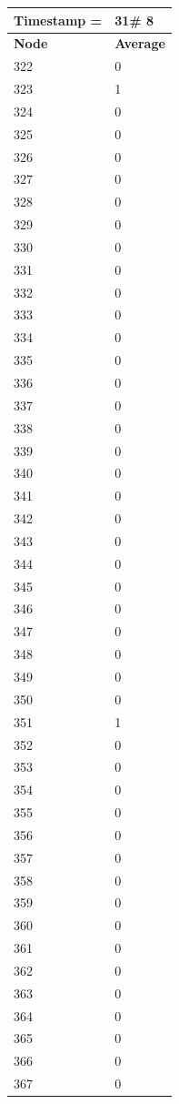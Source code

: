 \begin{tabular}{|l||l|}
\hline
\textbf{Timestamp =} & \textbf{31}\# 8\\\hline
	\textbf{Node} & \textbf{Average} \\ \hline
\hline
	322 & 0 \\ \hline
	323 & 1 \\ \hline
	324 & 0 \\ \hline
	325 & 0 \\ \hline
	326 & 0 \\ \hline
	327 & 0 \\ \hline
	328 & 0 \\ \hline
	329 & 0 \\ \hline
	330 & 0 \\ \hline
	331 & 0 \\ \hline
	332 & 0 \\ \hline
	333 & 0 \\ \hline
	334 & 0 \\ \hline
	335 & 0 \\ \hline
	336 & 0 \\ \hline
	337 & 0 \\ \hline
	338 & 0 \\ \hline
	339 & 0 \\ \hline
	340 & 0 \\ \hline
	341 & 0 \\ \hline
	342 & 0 \\ \hline
	343 & 0 \\ \hline
	344 & 0 \\ \hline
	345 & 0 \\ \hline
	346 & 0 \\ \hline
	347 & 0 \\ \hline
	348 & 0 \\ \hline
	349 & 0 \\ \hline
	350 & 0 \\ \hline
	351 & 1 \\ \hline
	352 & 0 \\ \hline
	353 & 0 \\ \hline
	354 & 0 \\ \hline
	355 & 0 \\ \hline
	356 & 0 \\ \hline
	357 & 0 \\ \hline
	358 & 0 \\ \hline
	359 & 0 \\ \hline
	360 & 0 \\ \hline
	361 & 0 \\ \hline
	362 & 0 \\ \hline
	363 & 0 \\ \hline
	364 & 0 \\ \hline
	365 & 0 \\ \hline
	366 & 0 \\ \hline
	367 & 0 \\ \hline
\end{tabular}
